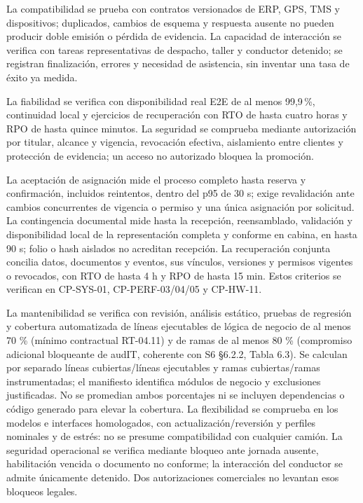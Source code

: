 La compatibilidad se prueba con contratos versionados de ERP, GPS, TMS y dispositivos; duplicados, cambios de esquema y respuesta ausente no pueden producir doble emisión o pérdida de evidencia. La capacidad de interacción se verifica con tareas representativas de despacho, taller y conductor detenido; se registran finalización, errores y necesidad de asistencia, sin inventar una tasa de éxito ya medida.

La fiabilidad se verifica con disponibilidad real E2E de al menos 99,9\,\%, continuidad local y ejercicios de recuperación con RTO de hasta cuatro horas y RPO de hasta quince minutos. La seguridad se comprueba mediante autorización por titular, alcance y vigencia, revocación efectiva, aislamiento entre clientes y protección de evidencia; un acceso no autorizado bloquea la promoción.

La aceptación de asignación mide el proceso completo hasta reserva y confirmación, incluidos reintentos, dentro del p95 de 30 s; exige revalidación ante cambios concurrentes de vigencia o permiso y una única asignación por solicitud. La contingencia documental mide hasta la recepción, reensamblado, validación y disponibilidad local de la representación completa y conforme en cabina, en hasta 90 s; folio o hash aislados no acreditan recepción. La recuperación conjunta concilia datos, documentos y eventos, sus vínculos, versiones y permisos vigentes o revocados, con RTO de hasta 4 h y RPO de hasta 15 min. Estos criterios se verifican en CP-SYS-01, CP-PERF-03/04/05 y CP-HW-11.

La mantenibilidad se verifica con revisión, análisis estático, pruebas de regresión y cobertura automatizada de líneas ejecutables de lógica de negocio de al menos 70 \% (mínimo contractual RT-04.11) y de ramas de al menos 80 \% (compromiso adicional bloqueante de audIT, coherente con S6 §6.2.2, Tabla 6.3). Se calculan por separado líneas cubiertas/líneas ejecutables y ramas cubiertas/ramas instrumentadas; el manifiesto identifica módulos de negocio y exclusiones justificadas. No se promedian ambos porcentajes ni se incluyen dependencias o código generado para elevar la cobertura. La flexibilidad se comprueba en los modelos e interfaces homologados, con actualización/reversión y perfiles nominales y de estrés: no se presume compatibilidad con cualquier camión. La seguridad operacional se verifica mediante bloqueo ante jornada ausente, habilitación vencida o documento no conforme; la interacción del conductor se admite únicamente detenido. Dos autorizaciones comerciales no levantan esos bloqueos legales.



